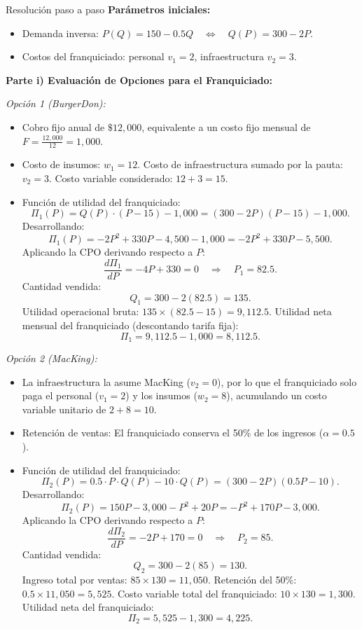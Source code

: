 \documentclass[11pt,a4paper]{article}
\begin{document}
\begin{pauta}{Resolución paso a paso}
\textbf{Parámetros iniciales:}
\begin{itemize}[itemsep=2pt]
    \item Demanda inversa: \(P(Q) = 150 - 0.5Q \quad\Longleftrightarrow\quad Q(P) = 300 - 2P\).
    \item Costos del franquiciado: personal \(v_1 = 2\), infraestructura \(v_2 = 3\).
\end{itemize}

\textbf{Parte i) Evaluación de Opciones para el Franquiciado:}

\textit{Opción 1 (BurgerDon):}
\begin{itemize}[itemsep=2pt]
    \item Cobro fijo anual de \(\$12{,}000\), equivalente a un costo fijo mensual de \(F = \frac{12{,}000}{12} = 1{,}000\).
    \item Costo de insumos: \(w_1 = 12\). Costo de infraestructura sumado por la pauta: \(v_2 = 3\). Costo variable considerado: \(12 + 3 = 15\).
    \item Función de utilidad del franquiciado:
    \[
    \Pi_1(P) = Q(P) \cdot (P - 15) - 1{,}000 = (300 - 2P)(P - 15) - 1{,}000.
    \]
    Desarrollando:
    \[
    \Pi_1(P) = -2P^2 + 330P - 4{,}500 - 1{,}000 = -2P^2 + 330P - 5{,}500.
    \]
    Aplicando la CPO derivando respecto a \(P\):
    \[
    \frac{d\Pi_1}{dP} = -4P + 330 = 0 \quad\Rightarrow\quad \boxed{P_1 = 82.5.}
    \]
    Cantidad vendida:
    \[
    Q_1 = 300 - 2(82.5) = \boxed{135.}
    \]
    Utilidad operacional bruta: \(135 \times (82.5 - 15) = 9{,}112.5\).
    Utilidad neta mensual del franquiciado (descontando tarifa fija):
    \[
    \Pi_1 = 9{,}112.5 - 1{,}000 = \boxed{8{,}112.5.}
    \]
\end{itemize}

\textit{Opción 2 (MacKing):}
\begin{itemize}[itemsep=2pt]
    \item La infraestructura la asume MacKing (\(v_2 = 0\)), por lo que el franquiciado solo paga el personal (\(v_1 = 2\)) y los insumos (\(w_2 = 8\)), acumulando un costo variable unitario de \(2 + 8 = 10\).
    \item Retención de ventas: El franquiciado conserva el 50\% de los ingresos (\(\alpha = 0.5\)).
    \item Función de utilidad del franquiciado:
    \[
    \Pi_2(P) = 0.5 \cdot P \cdot Q(P) - 10 \cdot Q(P) = (300 - 2P)(0.5P - 10).
    \]
    Desarrollando:
    \[
    \Pi_2(P) = 150P - 3{,}000 - P^2 + 20P = -P^2 + 170P - 3{,}000.
    \]
    Aplicando la CPO derivando respecto a \(P\):
    \[
    \frac{d\Pi_2}{dP} = -2P + 170 = 0 \quad\Rightarrow\quad \boxed{P_2 = 85.}
    \]
    Cantidad vendida:
    \[
    Q_2 = 300 - 2(85) = \boxed{130.}
    \]
    Ingreso total por ventas: \(85 \times 130 = 11{,}050\).
    Retención del 50\%: \(0.5 \times 11{,}050 = 5{,}525\).
    Costo variable total del franquiciado: \(10 \times 130 = 1{,}300\).
    Utilidad neta del franquiciado:
    \[
    \Pi_2 = 5{,}525 - 1{,}300 = \boxed{4{,}225.}
    \]
\end{itemize}


\end{pauta}
\end{document}
